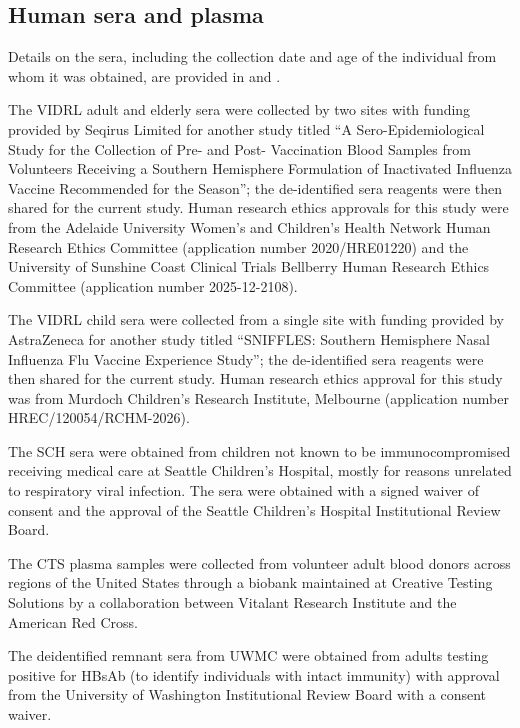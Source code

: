 \subsection{Human sera and plasma}

Details on the sera, including the collection date and age of the individual from whom it was obtained, are provided in \textbf{} and \textbf{}.

The VIDRL adult and elderly sera were collected by two sites with funding provided by Seqirus Limited for another study titled ``A Sero-Epidemiological Study for the Collection of Pre- and Post- Vaccination Blood Samples from Volunteers Receiving a Southern Hemisphere Formulation of Inactivated Influenza Vaccine Recommended for the Season''; the de-identified sera reagents were then shared for the current study. Human research ethics approvals for this study were from the Adelaide University Women's and Children's Health Network Human Research Ethics Committee (application number 2020/HRE01220) and the University of Sunshine Coast Clinical Trials Bellberry Human Research Ethics Committee (application number 2025-12-2108).

The VIDRL child sera were collected from a single site with funding provided by AstraZeneca for another study titled ``SNIFFLES: Southern Hemisphere Nasal Influenza Flu Vaccine Experience Study''; the de-identified sera reagents were then shared for the current study. Human research ethics approval for this study was from Murdoch Children's Research Institute, Melbourne (application number HREC/120054/RCHM-2026).

The SCH sera were obtained from children not known to be immunocompromised receiving medical care at Seattle Children's Hospital, mostly for reasons unrelated to respiratory viral infection. The sera were obtained with a signed waiver of consent and the approval of the Seattle Children's Hospital Institutional Review Board.

The CTS plasma samples were collected from volunteer adult blood donors across regions of the United States through a biobank maintained at Creative Testing Solutions by a collaboration between Vitalant Research Institute and the American Red Cross.

The deidentified remnant sera from UWMC were obtained from adults testing positive for HBsAb (to identify individuals with intact immunity) with approval from the University of Washington Institutional Review Board with a consent waiver.

